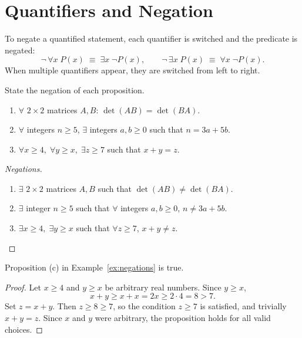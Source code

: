 \section{Quantifiers and Negation}

To negate a quantified statement, each quantifier is switched and the
predicate is negated:
\[
    \lnot\,\forall x\; P(x) \;\equiv\; \exists x\; \lnot P(x),
    \qquad
    \lnot\,\exists x\; P(x) \;\equiv\; \forall x\; \lnot P(x).
\]
When multiple quantifiers appear, they are switched from left to right.

\begin{example}\label{ex:negations}
State the negation of each proposition.
\begin{enumerate}[label=(\alph*)]
    \item $\forall$ $2 \times 2$ matrices $A, B$: $\det(AB) = \det(BA)$.
    \item $\forall$ integers $n \geq 5$, $\exists$ integers $a, b \geq 0$
          such that $n = 3a + 5b$.
    \item $\forall x \geq 4,\; \forall y \geq x,\; \exists z \geq 7$ such
          that $x + y = z$.
\end{enumerate}
\end{example}

\begin{proof}[Negations]
\begin{enumerate}[label=(\alph*)]
    \item $\exists$ $2 \times 2$ matrices $A, B$ such that
          $\det(AB) \neq \det(BA)$.

    \item $\exists$ integer $n \geq 5$ such that $\forall$ integers
          $a, b \geq 0$, $n \neq 3a + 5b$.

    \item $\exists x \geq 4,\; \exists y \geq x$ such that
          $\forall z \geq 7$, $x + y \neq z$.
\end{enumerate}
\end{proof}

\begin{proposition}
Proposition \textup{(c)} in Example~\ref{ex:negations} is true.
\end{proposition}


\begin{proof}
Let $x \geq 4$ and $y \geq x$ be arbitrary real numbers. Since $y \geq x$,
\[
    x + y \geq x + x = 2x \geq 2 \cdot 4 = 8 > 7.
\]
Set $z = x + y$. Then $z \geq 8 \geq 7$, so the condition $z \geq 7$ is
satisfied, and trivially $x + y = z$. Since $x$ and $y$ were arbitrary, the
proposition holds for all valid choices.
\end{proof}
